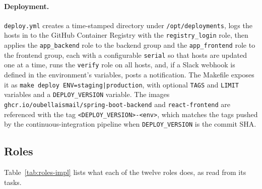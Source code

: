 \paragraph{Deployment.} \texttt{deploy.yml} creates a time-stamped directory under \texttt{/opt/deployments}, logs the hosts in to the GitHub Container Registry with the \texttt{registry\_login} role, then applies the \texttt{app\_backend} role to the backend group and the \texttt{app\_frontend} role to the frontend group, each with a configurable \texttt{serial} so that hosts are updated one at a time, runs the \texttt{verify} role on all hosts, and, if a Slack webhook is defined in the environment's variables, posts a notification. The Makefile exposes it as \texttt{make deploy ENV=staging|production}, with optional \texttt{TAGS} and \texttt{LIMIT} variables and a \texttt{DEPLOY\_VERSION} variable. The images \texttt{ghcr.io/oubellaismail/spring-boot-backend} and \texttt{react-frontend} are referenced with the tag \texttt{<DEPLOY\_VERSION>-<env>}, which matches the tags pushed by the continuous-integration pipeline when \texttt{DEPLOY\_VERSION} is the commit SHA.

\subsection{Roles}

Table~\ref{tab:roles-impl} lists what each of the twelve roles does, as read from its tasks.

